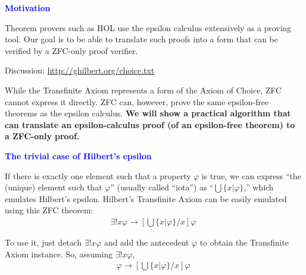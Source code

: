 \documentclass{slides}
\begin{document}
\begin{slide}

\begin{center}
\textcolor{blue}{\textbf{Motivation}}
\end{center}

Theorem provers such as HOL use the epsilon calculus extensively as a
proving tool.  Our goal is to be able to translate such proofs
into a form that can be verified by a ZFC-only proof verifier.

Discussion: \url{http://ghilbert.org/choice.txt}

While the Transfinite Axiom represents a form of the Axiom of Choice,
ZFC cannot express it directly.  ZFC can, however, prove the same
epsilon-free theorems as the epsilon calculus.  {\bf We will show a practical
algorithm that can translate an epsilon-calculus proof
(of an epsilon-free theorem) to a ZFC-only
proof.}

\end{slide}

\begin{slide}

\begin{center}
\textcolor{blue}{\textbf{The trivial case of Hilbert's epsilon}}
\end{center}

If there is exactly one element such that a property $\varphi$
 is true,
we can express ``the (unique) element such that
       $\varphi$'' (usually called ``iota'')
 as ``$\bigcup \{ x | \varphi \}$,'' which
emulates Hilbert's epsilon.  Hilbert's Transfinite
Axiom can be easily emulated using this ZFC theorem:
\begin{eqnarray}  %
 \exists{!} x \varphi \rightarrow [ \bigcup \{ x | \varphi
\} / x ] \varphi   \label{reuuni4}
\end{eqnarray}

To use it, just detach $\exists{!} x \varphi$ and add the
antecedent $\varphi$ to obtain the Transfinite Axiom instance.
So, assuming $\exists{!} x \varphi$,
\begin{eqnarray}
  \varphi \rightarrow [ \bigcup \{ x | \varphi
\} / x ] \varphi
\end{eqnarray}

\end{slide}
\end{document}
